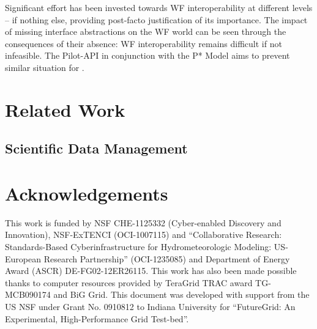\documentclass{sig-alternate}
\begin{document}

Significant effort has been invested towards WF interoperability at
different levels -- if nothing else, providing post-facto
justification of its importance. The impact of missing interface
abstractions on the WF world can be seen through the consequences of
their absence: WF interoperability remains difficult if not
infeasible. The Pilot-API in conjunction with the P* Model aims to
prevent similar situation for \pilotjobs.




\section{Related Work}


\subsection{Scientific Data Management}



\section*{Acknowledgements}
This work is funded by NSF CHE-1125332 (Cyber-enabled Discovery and
Innovation), NSF-ExTENCI (OCI-1007115) and ``Collaborative Research:
Standards-Based Cyberinfrastructure for Hydrometeorologic Modeling:
US-European Research Partnership'' (OCI-1235085) and Department of
Energy Award (ASCR) DE-FG02-12ER26115.  This work has also been made
possible thanks to computer resources provided by TeraGrid TRAC award
TG-MCB090174 and BiG Grid.  This document was developed with support
from the US NSF under Grant No. 0910812 to Indiana University for
``FutureGrid: An Experimental, High-Performance Grid Test-bed''.

% 


\end{document}
